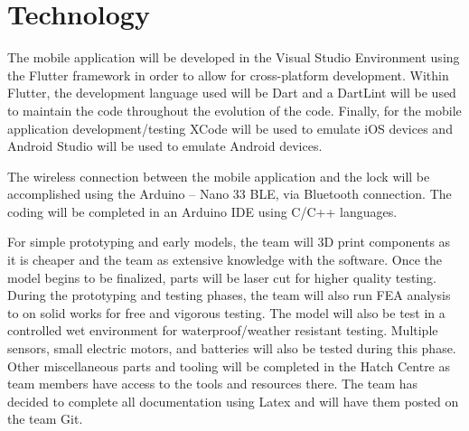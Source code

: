 \documentclass{article}
\begin{document}

\section{Technology}

The mobile application will be developed in the Visual Studio Environment using the Flutter framework in order to allow for cross-platform development.  Within Flutter, the development language used will be Dart and a DartLint will be used to maintain the code throughout the evolution of the code.  Finally, for the mobile application development/testing XCode will be used to emulate iOS devices and Android Studio will be used to emulate Android devices. 


The wireless connection between the mobile application and the lock will be accomplished using the Arduino – Nano 33 BLE, via Bluetooth connection.  The coding will be completed in an Arduino IDE using C/C++ languages.

For simple prototyping and early models, the team will 3D print components as it is cheaper and the team as extensive knowledge with the software. Once the model begins to be finalized, parts will be laser cut for higher quality testing. During the prototyping and testing phases, the team will also run FEA analysis to on solid works for free and vigorous testing. The model will also be test in a controlled wet environment for waterproof/weather resistant testing. Multiple sensors, small electric motors, and batteries will also be tested during this phase. Other miscellaneous parts and tooling will be completed in the Hatch Centre as team members have access to the tools and resources there. The team has decided to complete all documentation using Latex and will have them posted on the team Git.
\end{document}
